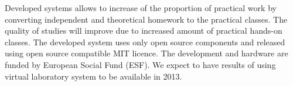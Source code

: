 Developed systems allows to  increase of the proportion of practical work by converting independent and theoretical homework to  the practical classes. The quality of studies will improve due to increased amount of practical hands-on classes. The developed system uses only open source components and released using open source compatible MIT licence. The development and hardware are funded by European Social Fund (ESF). We expect to have results of using virtual laboratory system to be available in 2013.

